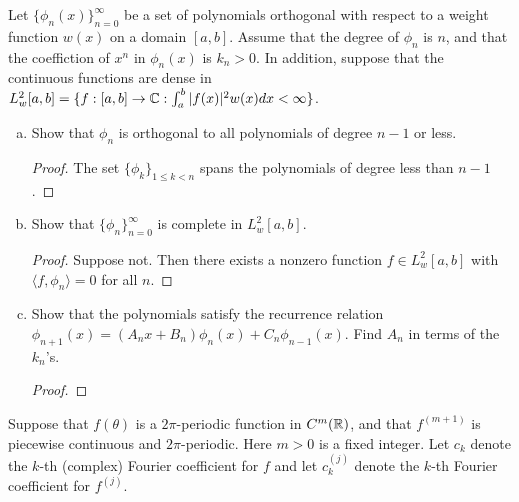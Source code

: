 \documentclass{article}
\begin{document}
  Let $\{\phi_n(x)\}_{n=0}^\infty$ be a set of polynomials orthogonal with respect to a weight function $w(x)$ on a domain $[a,b]$. Assume that the degree of $\phi_n$ is $n$, and that the coeffiction of $x^n$ in $\phi_n(x)$ is $k_n > 0$. In addition, suppose that the continuous functions are dense in $L_w^2[a,b] = \{f : [a,b] \to \mathbb{C} : \int_a^b |f(x)|^2 w(x) dx < \infty \}$.

\begin{enumerate}[(a)]
\item Show that $\phi_n$ is orthogonal to all polynomials of degree $n - 1$ or less.
\begin{proof}
The set $\{\phi_k\}_{1 \le k < n}$ spans the polynomials of degree less than $n-1$.
\end{proof}
\item Show that $\{ \phi_n \}_{n=0}^\infty$ is complete in $L_w^2[a,b]$.
\begin{proof}
Suppose not.  Then there exists a nonzero function $f \in L_w^2[a,b]$ with $\langle f, \phi_n \rangle = 0$ for all $n$.
\end{proof}
\item Show that the polynomials satisfy the recurrence relation $\phi_{n+1}(x) = (A_nx + B_n) \phi_n(x) + C_n \phi_{n-1}(x)$. Find $A_n$ in terms of the $k_n$'s.  
\begin{proof}

\end{proof}
\end{enumerate}


 Suppose that $f(\theta)$ is a $2 \pi$-periodic function in $C^m( \mathbb{R})$, and that $f^{(m+1)}$ is piecewise continuous and $2 \pi$-periodic. Here $m > 0$ is a fixed integer.  Let $c_k$ denote the $k$-th (complex) Fourier coefficient for $f$ and let $c_k^{(j)}$ denote the $k$-th Fourier coefficient for $f^{(j)}$.

\newcommand{\ckj}{c_k^{(j)}}
\end{document}
